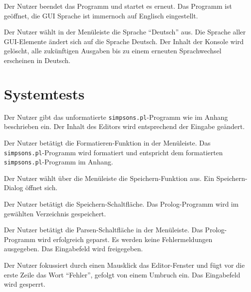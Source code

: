 \documentclass[parskip=full,11pt,twoside]{scrartcl}
\begin{document}
{Der Nutzer beendet das Programm und startet es erneut.}
{Das Programm ist geöffnet, die GUI Sprache ist immernoch auf Englisch eingestellt.}

{Der Nutzer wählt in der Menüleiste die Sprache \enquote{Deutsch} aus.}
{Die Sprache aller GUI-Elemente ändert sich auf die Sprache Deutsch. Der Inhalt der Konsole wird gelöscht, alle zukünftigen Ausgaben bis zu einem erneuten Sprachwechsel erscheinen in Deutsch.}

\section{Systemtests}


{Der Nutzer gibt das unformatierte \texttt{simpsons.pl}-Programm wie im Anhang beschrieben ein.}
{Der Inhalt des Editors wird entsprechend der Eingabe geändert.}

{Der Nutzer betätigt die Formatieren-Funktion in der Menüleiste.}
{Das \texttt{simpsons.pl}-Programm wird formatiert und entspricht dem formatierten \texttt{simpsons.pl}-Programm im Anhang.}

{Der Nutzer wählt über die Menüleiste die Speichern-Funktion aus.}
{Ein Speichern-Dialog öffnet sich.}

{Der Nutzer betätigt die Speichern-Schaltfläche.}
{Das Prolog-Programm wird im gewählten Verzeichnis gespeichert.}

{Der Nutzer betätigt die Parsen-Schaltfläche in der Menüleiste.}
{Das Prolog-Programm wird erfolgreich geparst. Es werden keine Fehlermeldungen ausgegeben. Das Eingabefeld wird freigegeben.}

{Der Nutzer fokussiert durch einen Mausklick das Editor-Fenster und fügt vor die erste Zeile das Wort \enquote{Fehler}, gefolgt von einem Umbruch ein.}
{Das Eingabefeld wird gesperrt.}
\end{document}
